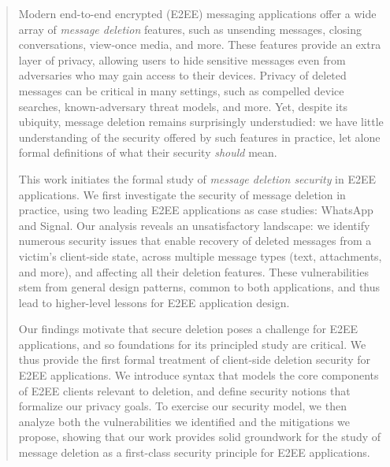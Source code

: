 \begin{abstract}
Modern end-to-end encrypted (E2EE) messaging applications offer a wide array of \emph{message deletion} features, such as unsending messages, closing conversations, view-once media, and more. 
These features provide an extra layer of privacy, 
allowing users to hide sensitive messages even from adversaries who may gain access to their devices. Privacy of deleted messages can be critical in many settings, such as compelled device searches, known-adversary threat models, and more. Yet, despite its ubiquity, message deletion remains surprisingly understudied: we have little understanding of the security offered by such features in practice, let alone formal definitions of what their security \emph{should} mean.

This work initiates the formal study of \emph{message deletion security} in E2EE applications. 
We first investigate the security of message deletion in practice, using two leading E2EE applications as case studies: WhatsApp and Signal. Our analysis reveals an unsatisfactory landscape: we identify numerous security issues that enable recovery of deleted messages from a victim's client-side state, across multiple message types (text, attachments, and more), and affecting all their deletion features. These vulnerabilities stem from general design patterns, common to both applications, and thus lead to higher-level lessons for E2EE application design.

Our findings motivate that secure deletion poses a challenge for E2EE applications, and so foundations for its principled study are critical. We thus provide the first formal treatment of client-side deletion security for E2EE applications. We introduce syntax that models the core components of E2EE clients relevant to deletion, and define security notions that formalize our privacy goals. To exercise our security model, we then analyze both the vulnerabilities we identified and the mitigations we propose, showing that our work provides solid groundwork for the study of message deletion as a first-class security principle for E2EE applications. 
\end{abstract}